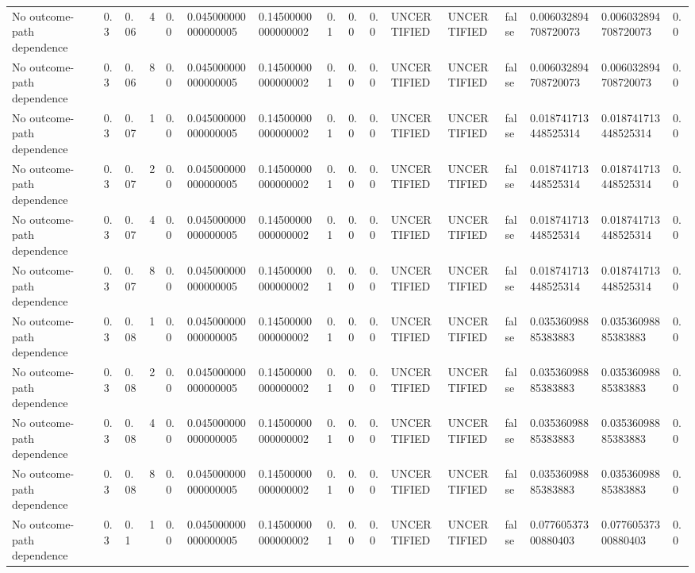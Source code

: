 \begin{tabular}{llllllllllllllll}
No outcome-path dependence & 0.3 & 0.06 & 4 & 0.0 & 0.045000000000000005 & 0.14500000000000002 & 0.1 & 0.0 & 0.0 & UNCERTIFIED & UNCERTIFIED & false & 0.006032894708720073 & 0.006032894708720073 & 0.0 \\
No outcome-path dependence & 0.3 & 0.06 & 8 & 0.0 & 0.045000000000000005 & 0.14500000000000002 & 0.1 & 0.0 & 0.0 & UNCERTIFIED & UNCERTIFIED & false & 0.006032894708720073 & 0.006032894708720073 & 0.0 \\
No outcome-path dependence & 0.3 & 0.07 & 1 & 0.0 & 0.045000000000000005 & 0.14500000000000002 & 0.1 & 0.0 & 0.0 & UNCERTIFIED & UNCERTIFIED & false & 0.018741713448525314 & 0.018741713448525314 & 0.0 \\
No outcome-path dependence & 0.3 & 0.07 & 2 & 0.0 & 0.045000000000000005 & 0.14500000000000002 & 0.1 & 0.0 & 0.0 & UNCERTIFIED & UNCERTIFIED & false & 0.018741713448525314 & 0.018741713448525314 & 0.0 \\
No outcome-path dependence & 0.3 & 0.07 & 4 & 0.0 & 0.045000000000000005 & 0.14500000000000002 & 0.1 & 0.0 & 0.0 & UNCERTIFIED & UNCERTIFIED & false & 0.018741713448525314 & 0.018741713448525314 & 0.0 \\
No outcome-path dependence & 0.3 & 0.07 & 8 & 0.0 & 0.045000000000000005 & 0.14500000000000002 & 0.1 & 0.0 & 0.0 & UNCERTIFIED & UNCERTIFIED & false & 0.018741713448525314 & 0.018741713448525314 & 0.0 \\
No outcome-path dependence & 0.3 & 0.08 & 1 & 0.0 & 0.045000000000000005 & 0.14500000000000002 & 0.1 & 0.0 & 0.0 & UNCERTIFIED & UNCERTIFIED & false & 0.03536098885383883 & 0.03536098885383883 & 0.0 \\
No outcome-path dependence & 0.3 & 0.08 & 2 & 0.0 & 0.045000000000000005 & 0.14500000000000002 & 0.1 & 0.0 & 0.0 & UNCERTIFIED & UNCERTIFIED & false & 0.03536098885383883 & 0.03536098885383883 & 0.0 \\
No outcome-path dependence & 0.3 & 0.08 & 4 & 0.0 & 0.045000000000000005 & 0.14500000000000002 & 0.1 & 0.0 & 0.0 & UNCERTIFIED & UNCERTIFIED & false & 0.03536098885383883 & 0.03536098885383883 & 0.0 \\
No outcome-path dependence & 0.3 & 0.08 & 8 & 0.0 & 0.045000000000000005 & 0.14500000000000002 & 0.1 & 0.0 & 0.0 & UNCERTIFIED & UNCERTIFIED & false & 0.03536098885383883 & 0.03536098885383883 & 0.0 \\
No outcome-path dependence & 0.3 & 0.1 & 1 & 0.0 & 0.045000000000000005 & 0.14500000000000002 & 0.1 & 0.0 & 0.0 & UNCERTIFIED & UNCERTIFIED & false & 0.07760537300880403 & 0.07760537300880403 & 0.0 \\

\end{tabular}
